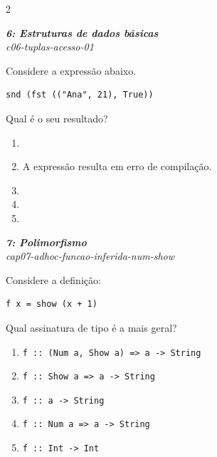 \documentclass[a4paper,10pt,brazil]{article}
\begin{document}
\begin{multicols}{2}
\begin{flushright}
  \footnotesize
  \textit{\textbf{6: Estruturas de dados básicas}}\\
  \textit{c06-tuplas-acesso-01}\\

\end{flushright}
Considere a expressão abaixo.
\begin{verbatim}
snd (fst (("Ana", 21), True))
\end{verbatim}
Qual é o seu resultado?

\begin{enumerate}
  \item {}

  \item A expressão resulta em erro de compilação.

  \item {}

  \item {}

  \item {}


\end{enumerate}

\begin{flushright}
  \footnotesize
  \textit{\textbf{7: Polimorfismo}}\\
  \textit{cap07-adhoc-funcao-inferida-num-show}\\

\end{flushright}
Considere a definição:

\begin{verbatim}
f x = show (x + 1)
\end{verbatim}

Qual assinatura de tipo é a mais geral?

\begin{enumerate}
  \item \texttt{f :: (Num a, Show a) => a -> String}
  \item \texttt{f :: Show a => a -> String}
  \item \texttt{f :: a -> String}
  \item \texttt{f :: Num a => a -> String}
  \item \texttt{f :: Int -> Int}


\end{enumerate}
\end{multicols}
\end{document}
